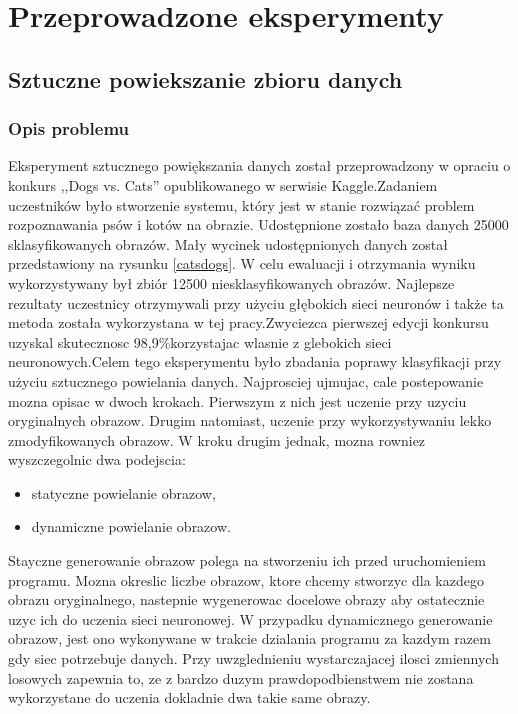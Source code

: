 \section{Przeprowadzone eksperymenty} \label{results}


\subsection{Sztuczne powiekszanie zbioru danych}
\subsubsection{Opis problemu}
Eksperyment sztucznego powiększania danych został przeprowadzony w opraciu o konkurs ,,Dogs vs. Cats'' opublikowanego w serwisie Kaggle.\footnotemark Zadaniem uczestników było stworzenie systemu, który jest w stanie rozwiązać problem rozpoznawania psów i kotów na obrazie. Udostępnione zostało baza danych 25000 sklasyfikowanych obrazów. Mały wycinek udostępnionych danych został przedstawiony na rysunku \ref{catsdogs}. W celu ewaluacji i otrzymania wyniku wykorzystywany był zbiór 12500 niesklasyfikowanych obrazów. Najlepsze rezultaty uczestnicy otrzymywali przy użyciu głębokich sieci neuronów i także ta metoda została wykorzystana w tej pracy.Zwyciezca pierwszej edycji konkursu uzyskal skutecznosc 98,9\%\footnotemark korzystajac wlasnie z glebokich sieci neuronowych.Celem tego eksperymentu było zbadania poprawy klasyfikacji przy użyciu sztucznego powielania danych. Najprosciej ujmujac, cale postepowanie mozna opisac w dwoch krokach. Pierwszym z nich jest uczenie przy uzyciu oryginalnych obrazow. Drugim natomiast, uczenie przy wykorzystywaniu lekko zmodyfikowanych obrazow. W kroku drugim jednak, mozna rowniez wyszczegolnic dwa podejscia:
\begin{itemize}
\item statyczne powielanie obrazow,
\item dynamiczne powielanie obrazow.
\end{itemize}
Stayczne generowanie obrazow polega na stworzeniu ich przed uruchomieniem programu. Mozna okreslic liczbe obrazow, ktore chcemy stworzyc dla kazdego obrazu oryginalnego, nastepnie wygenerowac docelowe obrazy aby ostatecznie uzyc ich do uczenia sieci neuronowej. W przypadku dynamicznego generowanie obrazow, jest ono wykonywane w trakcie dzialania programu za kazdym razem gdy siec potrzebuje danych. Przy uwzglednieniu wystarczajacej ilosci zmiennych losowych zapewnia to, ze z bardzo duzym prawdopodbienstwem nie zostana wykorzystane do uczenia dokladnie dwa takie same obrazy.

